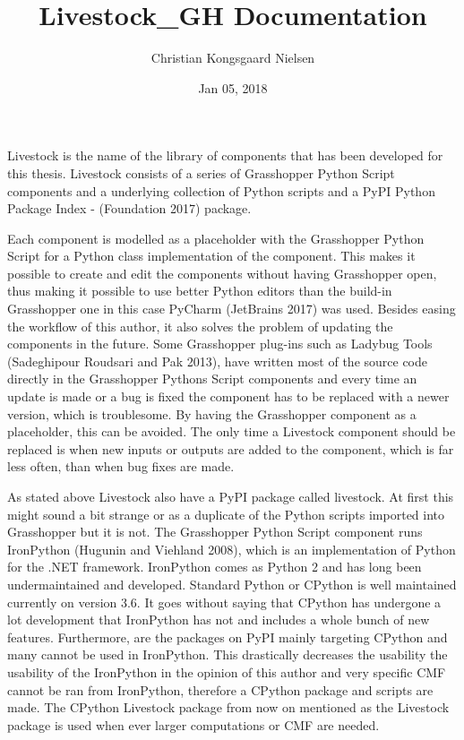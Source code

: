 \documentclass[letterpaper,10pt,english]{sphinxmanual}
\title{Livestock\_GH Documentation}
\date{Jan 05, 2018}
\author{Christian Kongsgaard Nielsen}
\begin{document}
\maketitle
\sphinxtableofcontents
{}\label{\detokenize{index::doc}}


Livestock is the name of the library of components that has been developed for this thesis.
Livestock consists of a series of Grasshopper Python Script components and a underlying collection of Python scripts
and a PyPI \textendash{} Python Package Index - (Foundation 2017) package.

Each component is modelled as a placeholder with the Grasshopper Python Script for a Python class implementation of the
component. This makes it possible to create and edit the components without having Grasshopper open, thus making it
possible to use better Python editors than the build-in Grasshopper one \textendash{} in this case PyCharm (JetBrains 2017) was
used. Besides easing the workflow of this author, it also solves the problem of updating the components in the future.
Some Grasshopper plug-ins such as Ladybug Tools (Sadeghipour Roudsari and Pak 2013), have written most of the source
code directly in the Grasshopper Pythons Script components and every time an update is made or a bug is fixed the
component has to be replaced with a newer version, which is troublesome. By having the Grasshopper component as a
placeholder, this can be avoided. The only time a Livestock component should be replaced is when new inputs or outputs
are added to the component, which is far less often, than when bug fixes are made.

As stated above Livestock also have a PyPI package \textendash{} called livestock. At first this might sound a bit strange or as a
duplicate of the Python scripts imported into Grasshopper \textendash{} but it is not. The Grasshopper Python Script component runs
IronPython (Hugunin and Viehland 2008), which is an implementation of Python for the .NET framework. IronPython comes as
Python 2 and has long been undermaintained and developed. Standard Python or CPython is well maintained currently on
version 3.6. It goes without saying that CPython has undergone a lot development that IronPython has not and includes
a whole bunch of new features. Furthermore, are the packages on PyPI mainly targeting CPython and many cannot be used
in IronPython. This drastically decreases the usability the usability of the IronPython in the opinion of this author
and very specific CMF cannot be ran from IronPython, therefore a CPython package and scripts are made. The CPython
Livestock package \textendash{} from now on mentioned as the Livestock package \textendash{} is used when ever larger computations or CMF are
needed.
\end{document}
